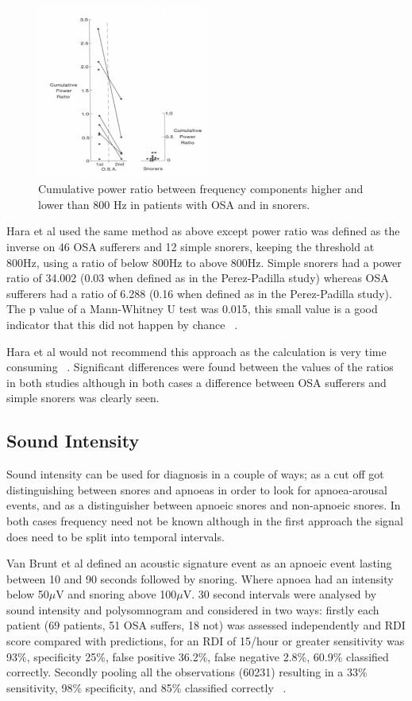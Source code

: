 \begin{figure}[h]
\centering 
\includegraphics[width=0.5\textwidth]{drawings/Perez1993fig8}
\caption{Cumulative power ratio between frequency components higher and lower than 800 Hz in patients with OSA and in snorers. ~\cite{whitelaw1993characteristics}}
\label{fig: Perez1993fig8}
\end{figure}

Hara et al used the same method as above except power ratio was defined as the inverse on 46 OSA sufferers and 12 simple snorers, keeping the threshold at 800Hz, using a ratio of below 800Hz to above 800Hz. Simple snorers had a power ratio of 34.002 (0.03 when defined as in the Perez-Padilla study) whereas OSA sufferers had a ratio of 6.288 (0.16 when defined as in the Perez-Padilla study). The p value of a Mann-Whitney U test was 0.015, this small value is a good indicator that this did not happen by chance ~\cite{hara2006acoustic}. 

Hara et al would not recommend this approach as the calculation is very time consuming ~\cite{hara2006acoustic}. Significant differences were found between the values of the ratios in both studies although in both cases a difference between OSA sufferers and simple snorers was clearly seen. 
\subsection{Sound Intensity}
Sound intensity can be used for diagnosis in a couple of ways; as a cut off got distinguishing between snores and apnoeas in order to look for apnoea-arousal events, and as a distinguisher between apnoeic snores and non-apnoeic snores. In both cases frequency need not be known although in the first approach the signal does need to be split into temporal intervals. 

Van Brunt et al defined an acoustic signature event as an apnoeic event lasting between 10 and 90 seconds followed by snoring. Where apnoea had an intensity below 50$\mu$V and snoring above 100$\mu$V. 30 second intervals were analysed by sound intensity and polysomnogram and considered in two ways: firstly each patient (69 patients, 51 OSA suffers, 18 not) was assessed independently and RDI score compared with predictions, for an RDI of 15/hour or greater sensitivity was 93\%, specificity 25\%, false positive 36.2\%, false negative 2.8\%, 60.9\% classified correctly. Secondly pooling all the observations (60231) resulting in a 33\% sensitivity, 98\% specificity, and 85\% classified correctly ~\cite{van1997intensity}.

